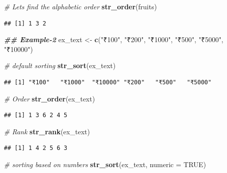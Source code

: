 \documentclass[
]{book}
\newenvironment{Shaded}{\begin{snugshade}}{\end{snugshade}}
\newcommand{\AttributeTok}[1]{\textcolor[rgb]{0.13,0.29,0.53}{#1}}
\newcommand{\CommentTok}[1]{\textcolor[rgb]{0.56,0.35,0.01}{\textit{#1}}}
\newcommand{\ConstantTok}[1]{\textcolor[rgb]{0.56,0.35,0.01}{#1}}
\newcommand{\DocumentationTok}[1]{\textcolor[rgb]{0.56,0.35,0.01}{\textbf{\textit{#1}}}}
\newcommand{\FunctionTok}[1]{\textcolor[rgb]{0.13,0.29,0.53}{\textbf{#1}}}
\newcommand{\NormalTok}[1]{#1}
\newcommand{\OtherTok}[1]{\textcolor[rgb]{0.56,0.35,0.01}{#1}}
\newcommand{\StringTok}[1]{\textcolor[rgb]{0.31,0.60,0.02}{#1}}
\begin{document}
\begin{Shaded}
\begin{Highlighting}[]
\CommentTok{\# Let\textquotesingle{}s find the alphabetic order}
\FunctionTok{str\_order}\NormalTok{(fruits)}
\end{Highlighting}
\end{Shaded}

\begin{verbatim}
## [1] 1 3 2
\end{verbatim}

\begin{Shaded}
\begin{Highlighting}[]
\DocumentationTok{\#\# Example{-}2}
\NormalTok{ex\_text }\OtherTok{\textless{}{-}} \FunctionTok{c}\NormalTok{(}\StringTok{"₹100"}\NormalTok{, }\StringTok{"₹200"}\NormalTok{, }\StringTok{"₹1000"}\NormalTok{, }\StringTok{"₹500"}\NormalTok{, }\StringTok{"₹5000"}\NormalTok{, }\StringTok{"₹10000"}\NormalTok{)}

\CommentTok{\# default sorting}
\FunctionTok{str\_sort}\NormalTok{(ex\_text)}
\end{Highlighting}
\end{Shaded}

\begin{verbatim}
## [1] "₹100"   "₹1000"  "₹10000" "₹200"   "₹500"   "₹5000"
\end{verbatim}

\begin{Shaded}
\begin{Highlighting}[]
\CommentTok{\# Order}
\FunctionTok{str\_order}\NormalTok{(ex\_text)}
\end{Highlighting}
\end{Shaded}

\begin{verbatim}
## [1] 1 3 6 2 4 5
\end{verbatim}

\begin{Shaded}
\begin{Highlighting}[]
\CommentTok{\# Rank}
\FunctionTok{str\_rank}\NormalTok{(ex\_text)}
\end{Highlighting}
\end{Shaded}

\begin{verbatim}
## [1] 1 4 2 5 6 3
\end{verbatim}

\begin{Shaded}
\begin{Highlighting}[]
\CommentTok{\# sorting based on numbers}
\FunctionTok{str\_sort}\NormalTok{(ex\_text, }\AttributeTok{numeric =} \ConstantTok{TRUE}\NormalTok{)}
\end{Highlighting}
\end{Shaded}
\end{document}
